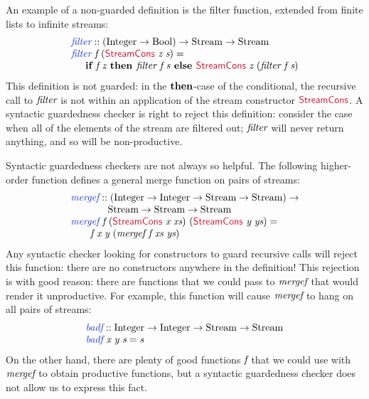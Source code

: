 An example of a non-guarded definition is the filter function,
extended from finite lists to infinite streams:
\begin{displaymath}
  \begin{array}{l}
    \defn{filter} :: (\tyname{Integer} \to \tyname{Bool}) \to \tyname{Stream} \to \tyname{Stream} \\
    \defn{filter}\ \ident{f}\ (\cons{StreamCons}\ \ident{z}\ \ident{s}) = \\
    \hspace{0.5cm}\kw{if }\ident{f}\ \ident{z}\kw{ then }\ident{filter}\ \ident{f}\ \ident{s}\kw{ else }\cons{StreamCons}\ \ident{z}\ (\ident{filter}\ \ident{f}\ \ident{s})
  \end{array}
\end{displaymath}
This definition is not guarded: in the $\textbf{then}$-case of the
conditional, the recursive call to $\textit{filter}$ is not within an
application of the stream constructor $\cons{StreamCons}$. A syntactic
guardedness checker is right to reject this definition: consider the
case when all of the elements of the stream are filtered out;
$\textit{filter}$ will never return anything, and so will be
non-productive.

Syntactic guardedness checkers are not always so helpful. The
following higher-order function defines a general merge function on
pairs of streams:
\begin{displaymath}
  \begin{array}{l}
    \defn{mergef} :: (\tyname{Integer} \to \tyname{Integer} \to \tyname{Stream} \to \tyname{Stream}) \to \\
    \textcolor{white}{\textrm{mergef} :: }\tyname{Stream} \to \tyname{Stream} \to \tyname{Stream} \\
    \defn{mergef}\ \ident{f}\ (\cons{StreamCons}\ \ident{x}\ \ident{xs})\ (\cons{StreamCons}\ \ident{y}\ \ident{ys}) = \\
    \quad\quad \ident{f}\ \ident{x}\ \ident{y}\ (\ident{mergef}\ \ident{f}\ \ident{xs}\ \ident{ys})
  \end{array}
\end{displaymath}
Any syntactic checker looking for constructors to guard recursive
calls will reject this function: there are no constructors anywhere in
the definition! This rejection is with good reason: there are
functions that we could pass to $\textit{mergef}$ that would render it
unproductive. For example, this function will cause $\textit{mergef}$
to hang on all pairs of streams:
\begin{displaymath}
  \begin{array}{l}
    \defn{badf} :: \tyname{Integer} \to \tyname{Integer} \to \tyname{Stream} \to \tyname{Stream} \\
    \defn{badf}\ \ident{x}\ \ident{y}\ \ident{s} = \ident{s}
  \end{array}
\end{displaymath}
On the other hand, there are plenty of good functions $\textit{f}$ that
we could use with $\textit{mergef}$ to obtain productive functions, but
a syntactic guardedness checker does not allow us to express this
fact.

